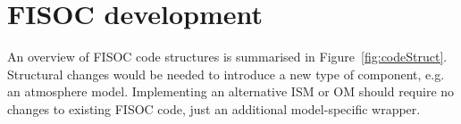 \documentclass[12pt]{article}
\begin{document}









\section{FISOC development}
\label{sec:FISOC_SDG}

An overview of FISOC code structures is summarised 
in Figure~\ref{fig:codeStruct}.  
Structural changes would be needed to introduce a new type 
of component, e.g. an atmosphere model.
Implementing an alternative ISM or OM should require no changes 
to existing FISOC code, just an additional model-specific wrapper.
\end{document}
